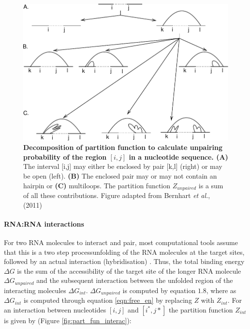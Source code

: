 \begin{figure}[htbp!]
\center
\includegraphics[width=1\textwidth]{chapters/Introduction/Figures/accs.pdf}
\caption[Decomposition of partition function to calculate unpairing probability of the region $(i,j)$ in a nucleotide sequence.]{\textbf{Decomposition of partition function to calculate unpairing probability of the region $[i,j]$ in a nucleotide sequence. (A)}  The interval [i,j] may either be enclosed by pair [k,l] (right) or may be open (left). \textbf{(B)} The enclosed pair may or may not contain an hairpin or \textbf{(C)} multiloops. The partition function $Z_{unpaired}$ is a sum of all these contributions.  Figure adapted from Bernhart \textit{et al.}, (2011)}%
\label{fig:part_fun_decomp}
\end{figure}




\paragraph{RNA:RNA interactions} \label{subsec:rna_interac}
For two RNA molecules to interact and pair, most computational tools assume that this is  a two step process\textemdash unfolding of the RNA molecules at the target sites, followed by an actual interaction (hybridisation) \cite{Muckstein2006-ys}.
Thus, the total binding energy $\Delta G$ is the sum of the accessibility of the target site of the longer RNA molecule $\Delta G_{unpaired}$ and the subsequent interaction between the unfolded region of the interacting molecules $\Delta G_{int}$. $\Delta G_{unpaired}$ is computed by equation $1.8$, where as $\Delta G_{int}$ is computed through equation \ref{eqn:free_en} by replacing $Z$ with $Z_{int}$. For an interaction between nucleotides $[i, j]$ and $[i^*, j*]$ the partition function $Z_{int}$ is given by \cite{Muckstein2006-ys} (Figure \ref{fig:part_fun_interac}):





